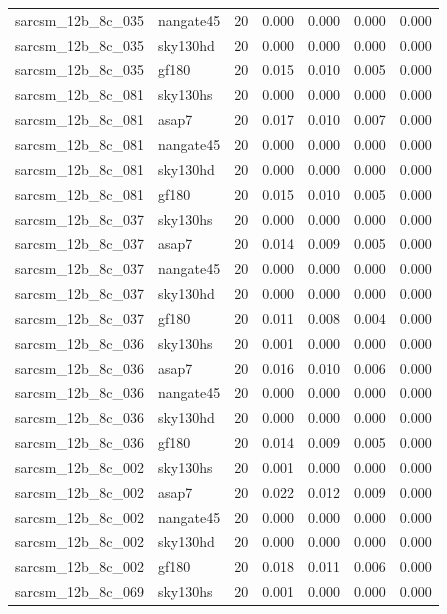\begin{tabular}{llrrrrr}
sarcsm\_12b\_8c\_035 & nangate45 & 20 & 0.000 & 0.000 & 0.000 & 0.000 \\
sarcsm\_12b\_8c\_035 & sky130hd & 20 & 0.000 & 0.000 & 0.000 & 0.000 \\
sarcsm\_12b\_8c\_035 & gf180 & 20 & 0.015 & 0.010 & 0.005 & 0.000 \\
sarcsm\_12b\_8c\_081 & sky130hs & 20 & 0.000 & 0.000 & 0.000 & 0.000 \\
sarcsm\_12b\_8c\_081 & asap7 & 20 & 0.017 & 0.010 & 0.007 & 0.000 \\
sarcsm\_12b\_8c\_081 & nangate45 & 20 & 0.000 & 0.000 & 0.000 & 0.000 \\
sarcsm\_12b\_8c\_081 & sky130hd & 20 & 0.000 & 0.000 & 0.000 & 0.000 \\
sarcsm\_12b\_8c\_081 & gf180 & 20 & 0.015 & 0.010 & 0.005 & 0.000 \\
sarcsm\_12b\_8c\_037 & sky130hs & 20 & 0.000 & 0.000 & 0.000 & 0.000 \\
sarcsm\_12b\_8c\_037 & asap7 & 20 & 0.014 & 0.009 & 0.005 & 0.000 \\
sarcsm\_12b\_8c\_037 & nangate45 & 20 & 0.000 & 0.000 & 0.000 & 0.000 \\
sarcsm\_12b\_8c\_037 & sky130hd & 20 & 0.000 & 0.000 & 0.000 & 0.000 \\
sarcsm\_12b\_8c\_037 & gf180 & 20 & 0.011 & 0.008 & 0.004 & 0.000 \\
sarcsm\_12b\_8c\_036 & sky130hs & 20 & 0.001 & 0.000 & 0.000 & 0.000 \\
sarcsm\_12b\_8c\_036 & asap7 & 20 & 0.016 & 0.010 & 0.006 & 0.000 \\
sarcsm\_12b\_8c\_036 & nangate45 & 20 & 0.000 & 0.000 & 0.000 & 0.000 \\
sarcsm\_12b\_8c\_036 & sky130hd & 20 & 0.000 & 0.000 & 0.000 & 0.000 \\
sarcsm\_12b\_8c\_036 & gf180 & 20 & 0.014 & 0.009 & 0.005 & 0.000 \\
sarcsm\_12b\_8c\_002 & sky130hs & 20 & 0.001 & 0.000 & 0.000 & 0.000 \\
sarcsm\_12b\_8c\_002 & asap7 & 20 & 0.022 & 0.012 & 0.009 & 0.000 \\
sarcsm\_12b\_8c\_002 & nangate45 & 20 & 0.000 & 0.000 & 0.000 & 0.000 \\
sarcsm\_12b\_8c\_002 & sky130hd & 20 & 0.000 & 0.000 & 0.000 & 0.000 \\
sarcsm\_12b\_8c\_002 & gf180 & 20 & 0.018 & 0.011 & 0.006 & 0.000 \\
sarcsm\_12b\_8c\_069 & sky130hs & 20 & 0.001 & 0.000 & 0.000 & 0.000 \\

\end{tabular}
